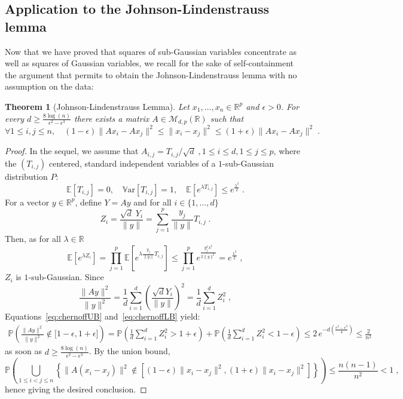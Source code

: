 \documentclass{ps}
\def\R{\mathbb{R}}
\renewcommand{\P}{\mathbb{P}}
\newcommand{\E}{\mathbb{E}}
\newcommand{\Var}{\mathbb{V}\!\mathrm{ar}}
\newcommand{\1}{\mathbbm{1}}
\theoremstyle{plain}
\newtheorem{theorem}{Theorem}
\begin{document}
\subsection{Application to the Johnson-Lindenstrauss lemma }\label{sec:JL}
Now that we have proved that squares of sub-Gaussian variables concentrate as well as squares of Gaussian variables, we recall for the sake of self-containment the argument that permits to obtain the Johnson-Lindenstrauss lemma with no assumption on the data: 
\begin{theorem}[Johnson-Lindenstrauss Lemma]\label{thm:classicalJL}
Let $x_1,\dots,x_n\in\R^p$ and $\epsilon>0$. For every $d\geq \frac{8\log(n)}{\epsilon^2-\epsilon^3}$ there exists a matrix $A\in\mathcal{M}_{d,p}(\R)$ such that 
\begin{equation}\label{eq:JLprop} \forall 1\leq i,j\leq n, \quad (1-\epsilon) \|Ax_i-Ax_j\|^2\leq \|x_i-x_j\|^2 \leq (1+\epsilon) \|Ax_i-Ax_j\|^2 \;.\end{equation}
\end{theorem}
\begin{proof}
In the sequel, we assume that $A_{i,j} =  T_{i,j}/\sqrt{d}\;, 1\leq i\leq d,1\leq j\leq p$, where the $(T_{i,j})$ centered, standard independent variables of a $1$-sub-Gaussian distribution $P$: 
\[\E[T_{i,j}] = 0, \quad \Var[T_{i,j}] = 1, \quad \E\left[e^{\lambda T_{i,j}}\right] \leq e^{\frac{\lambda^2}{2}} \;.\]
%
For a vector $y\in\R^p$, define $Y = Ay$ and for all $i\in\{1,\dots,d\}$
\[Z_i = \frac{\sqrt{d} \;Y_i}{\|y\|}  = \sum_{j=1}^p \frac{y_j}{\|y\|}T_{i,j}\;.\] 
Then, as  for all $\lambda\in\R$
\[\E\left[e^{\lambda Z_i}\right] = \prod_{j=1}^p \E\left[e^{\lambda \frac{y_j}{\|y\|}T_{i,j}}\right] \leq \prod_{j=1}^p e^{\frac{y_j^2\lambda^2}{2\|y\|^2}}  = e^{\frac{\lambda^2}{2}}\;, \]
$Z_i$ is $1$-sub-Gaussian.
Since 
\[  \frac{\|Ay\|^2}{\|y\|^2}  = \frac{1}{d} \sum_{i=1}^d \left(\frac{\sqrt{d}Y_i}{\|y\|}\right)^2  = \frac{1}{d} \sum_{i=1}^d Z_i^2\;,\]
Equations~\eqref{eq:chernoffUB} and~\eqref{eq:chernoffLB} yield:
\begin{align*} 
\P\left( \frac{\|Ay\|^2}{\|y\|^2} \notin \big[1-\epsilon, 1+\epsilon\big]  \right)
= \P\left(  \frac{1}{d} \sum_{i=1}^d Z_i^2 > 1+\epsilon \right) + \P\left(  \frac{1}{d} \sum_{i=1}^d Z_i^2 < 1-\epsilon \right)
\leq 2\,
e^{-d\left(\frac{\epsilon^2 - \epsilon^3}{4} \right)}  \leq \frac{2}{n^2}
\end{align*}
as soon as $d\geq \frac{8\log(n)}{\epsilon^2-\epsilon^3}$. By the union bound, 
\[\P\left( \bigcup_{1\leq i<j\leq n} \left\{ \big\|A(x_i-x_j)\big\|^2 \notin \left[ (1-\epsilon)\|x_i-x_j\|^2  ,  (1+\epsilon)\|x_i-x_j\|^2  \right] \right\}  \right) \leq \frac{n(n-1)}{n^2}<1\;,\]
hence giving the desired conclusion.
\end{proof}
\end{document}
